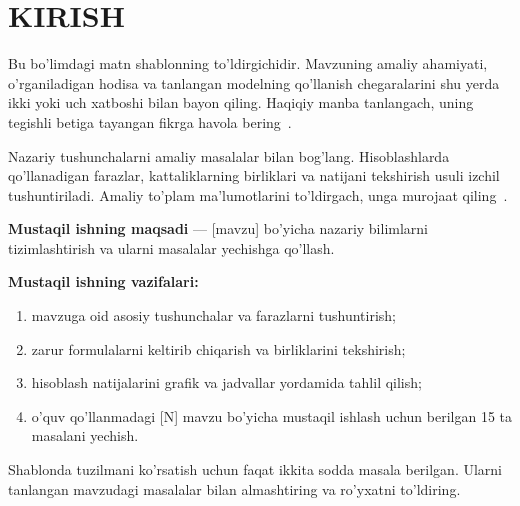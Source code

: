 \clearpage
\section*{KIRISH}

Bu bo’limdagi matn shablonning to’ldirgichidir. Mavzuning amaliy ahamiyati,
o’rganiladigan hodisa va tanlangan modelning qo’llanish chegaralarini shu yerda
ikki yoki uch xatboshi bilan bayon qiling. Haqiqiy manba tanlangach, uning
tegishli betiga tayangan fikrga havola bering~\cite{manba:nazariya}.

Nazariy tushunchalarni amaliy masalalar bilan bog’lang. Hisoblashlarda
qo’llanadigan farazlar, kattaliklarning birliklari va natijani tekshirish usuli
izchil tushuntiriladi. Amaliy to’plam ma’lumotlarini to’ldirgach,
unga murojaat qiling~\cite{manba:toplam}.

\textbf{Mustaqil ishning maqsadi} --- [mavzu] bo’yicha nazariy bilimlarni
tizimlashtirish va ularni masalalar yechishga qo’llash.

\textbf{Mustaqil ishning vazifalari:}
\begin{enumerate}
  \item mavzuga oid asosiy tushunchalar va farazlarni tushuntirish;
  \item zarur formulalarni keltirib chiqarish va birliklarini tekshirish;
  \item hisoblash natijalarini grafik va jadvallar yordamida tahlil qilish;
  \item o’quv qo’llanmadagi [N] mavzu bo’yicha mustaqil ishlash uchun
    berilgan 15 ta masalani yechish.
\end{enumerate}

Shablonda tuzilmani ko’rsatish uchun faqat ikkita sodda masala berilgan.
Ularni tanlangan mavzudagi masalalar bilan almashtiring va ro’yxatni to’ldiring.

